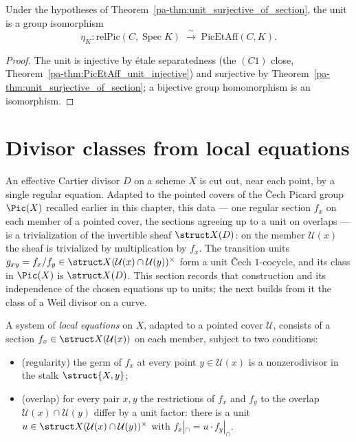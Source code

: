 \begin{theorem}
  \label{pa-thm:unitEquiv_of_section}
  \leanok

  Under the hypotheses of Theorem~\ref{pa-thm:unit_surjective_of_section}, the unit is a group
  isomorphism
  \[
    \eta_K \colon \mathrm{relPic}(C, \operatorname{Spec} K) \;\xrightarrow{\ \sim\ }\;
      \mathrm{PicEtAff}(C, K).
  \]
\end{theorem}
\begin{proof}
  \leanok
  The unit is injective by \'etale separatedness (the \((C1)\) close,
  Theorem~\ref{pa-thm:PicEtAff_unit_injective}) and surjective by
  Theorem~\ref{pa-thm:unit_surjective_of_section}; a bijective group homomorphism is an isomorphism.
\end{proof}

\section{Divisor classes from local equations}

An effective Cartier divisor \(D\) on a scheme \(X\) is cut out, near each point, by a single
regular equation. Adapted to the pointed covers of the \v Cech Picard group \(\Pic(X)\) recalled
earlier in this chapter, this data --- one regular section \(f_x\) on each member
of a pointed cover, the sections agreeing up to a unit on overlaps --- is a trivialization of the
invertible sheaf \(\struct X(D)\): on the member \(\mathcal U(x)\) the sheaf is trivialized by
multiplication by \(f_x\). The transition units \(g_{xy} = f_x/f_y \in \struct
X(\mathcal U(x) \cap \mathcal U(y))^{\times}\) form a unit \v Cech \(1\)-cocycle, and its class in
\(\Pic(X)\) is \(\struct X(D)\). This section records that construction and its independence of
the chosen equations up to units; the next builds from it the class of a Weil divisor on a curve.

\begin{definition}
  \label{pa-def:localEquations}
  \leanok

  A system of \emph{local equations} on \(X\), adapted to a pointed cover \(\mathcal U\), consists
  of a section \(f_x \in \struct X(\mathcal U(x))\) on each member, subject to two conditions:
  \begin{itemize}
    \item (regularity) the germ of \(f_x\) at every point \(y \in \mathcal U(x)\) is a
      nonzerodivisor in the stalk \(\struct{X,y}\);
    \item (overlap) for every pair \(x, y\) the restrictions of \(f_x\) and \(f_y\) to the overlap
      \(\mathcal U(x) \cap \mathcal U(y)\) differ by a unit factor: there is a unit \(u \in
      \struct X(\mathcal U(x) \cap \mathcal U(y))^{\times}\) with \(f_x|_{\cap} = u \cdot
      f_y|_{\cap}\).
  \end{itemize}
\end{definition}

